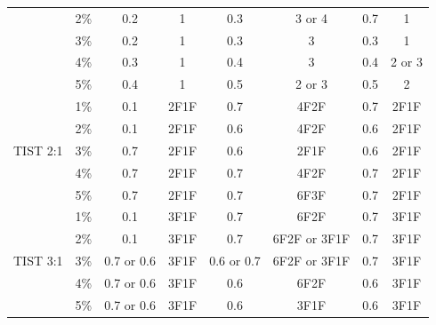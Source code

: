 \documentclass[pgmicro,mestrado,english]{iiufrgs}
\begin{document}
\begin{table}[]
{\begin{tabular}{|c|c|c|c|c|c|c|c|}
                          & 2\% & 0.2        & 1      & 0.3        & 3 or 4       & 0.7        & 1      \\ \cline{2-8}
                          & 3\% & 0.2        & 1      & 0.3        & 3            & 0.3        & 1      \\ \cline{2-8}
                          & 4\% & 0.3        & 1      & 0.4        & 3            & 0.4        & 2 or 3 \\ \cline{2-8}
                          & 5\% & 0.4        & 1      & 0.5        & 2 or 3       & 0.5        & 2      \\ \hline
\multirow{5}{*}{TIST 2:1} & 1\% & 0.1        & 2F1F   & 0.7        & 4F2F         & 0.7        & 2F1F   \\ \cline{2-8}
                          & 2\% & 0.1        & 2F1F   & 0.6        & 4F2F         & 0.6        & 2F1F   \\ \cline{2-8}
                          & 3\% & 0.7        & 2F1F   & 0.6        & 2F1F         & 0.6        & 2F1F   \\ \cline{2-8}
                          & 4\% & 0.7        & 2F1F   & 0.7        & 4F2F         & 0.7        & 2F1F   \\ \cline{2-8}
                          & 5\% & 0.7        & 2F1F   & 0.7        & 6F3F         & 0.7        & 2F1F   \\ \hline
\multirow{5}{*}{TIST 3:1} & 1\% & 0.1        & 3F1F   & 0.7        & 6F2F         & 0.7        & 3F1F   \\ \cline{2-8}
                          & 2\% & 0.1        & 3F1F   & 0.7        & 6F2F or 3F1F & 0.7        & 3F1F   \\ \cline{2-8}
                          & 3\% & 0.7 or 0.6 & 3F1F   & 0.6 or 0.7 & 6F2F or 3F1F & 0.7        & 3F1F   \\ \cline{2-8}
                          & 4\% & 0.7 or 0.6 & 3F1F   & 0.6        & 6F2F         & 0.6        & 3F1F   \\ \cline{2-8}
                          & 5\% & 0.7 or 0.6 & 3F1F   & 0.6        & 3F1F         & 0.6        & 3F1F   \\ \hline
\end{tabular}
}
\end{table}
\end{document}
